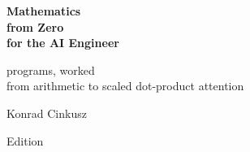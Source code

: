 \thispagestyle{empty}
\begin{center}
\vspace*{3.0cm}

{\Huge\bfseries\color{mblue} Mathematics\\[6pt] from Zero\\[6pt] for the AI Engineer}

\vspace{1.0cm}
{\Large\color{mgrey}  programs, worked \dash{}\\[4pt]
from arithmetic to scaled dot-product attention}

\vspace{2.4cm}
{\large Konrad Cinkusz}

\vfill
{\small\color{mgrey} Edition \bookedition}

\vspace{1.2cm}
\end{center}
\clearpage
